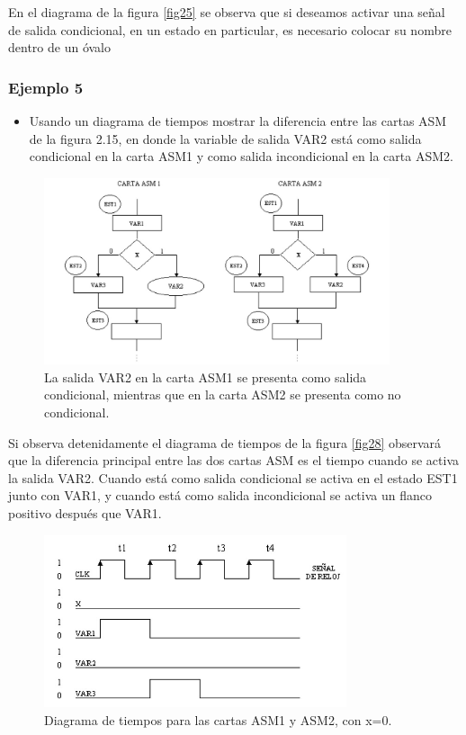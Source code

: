 \documentclass[12pt]{book}
\theoremstyle{definition}
\theoremstyle{remark}
\theoremstyle{plain}
\begin{document}
En el diagrama de la figura \ref{fig25} se observa que si deseamos activar una señal de salida condicional, en un estado
en particular, es necesario colocar su nombre dentro de un óvalo

\subsubsection{Ejemplo 5}

\begin{itemize}
\item Usando un diagrama de tiempos mostrar la diferencia entre las cartas ASM de la figura 2.15, en donde la variable de salida VAR2 está como salida condicional en la carta ASM1 y como salida incondicional en la carta ASM2.
\end{itemize}

\begin{figure}
\centering
\includegraphics[width=4in]{ASMejemplo5.jpg}
\caption{La salida VAR2 en la carta ASM1 se presenta como salida condicional, mientras que en la carta ASM2 se presenta como no condicional.}
\label{fig26}
\end{figure}

Si observa detenidamente el diagrama de tiempos de la figura \ref{fig28} observará que la diferencia principal entre las dos cartas ASM es el tiempo cuando se activa la salida VAR2. Cuando está como salida condicional se activa en el estado EST1 junto con VAR1, y cuando está como salida incondicional se activa un flanco positivo después que VAR1.



\begin{figure}
\centering
\includegraphics[width=3.5in]{ASMtiempos1.jpg}
\caption{Diagrama de tiempos para las cartas ASM1 y ASM2, con x=0.}
\label{fig27}
\end{figure}
\end{document}
